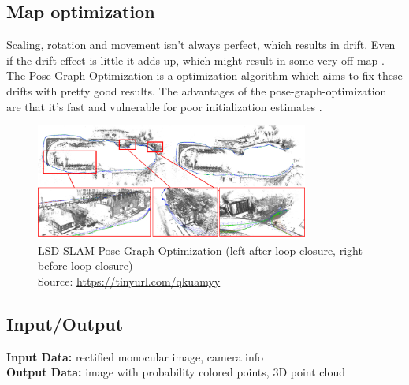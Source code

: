 \subsection{Map optimization}
Scaling, rotation and movement isn't always perfect, which results in drift. Even if the drift effect is little it adds up, which might result in some very off map \cite{lsdslam_eccv}. The Pose-Graph-Optimization is a optimization algorithm which aims to fix these drifts with pretty good results. The advantages of the pose-graph-optimization are that it's fast and vulnerable for poor initialization estimates \cite{posegraphoptimization}. \newline

\begin{figure}[h]
	\centering
	\includegraphics[width=0.8\textwidth]{./media/images/lsd-slam-pose-graph-optimization.jpg}
  	\caption{LSD-SLAM Pose-Graph-Optimization (left after loop-closure, right before loop-closure)
  	\\Source: \url{https://tinyurl.com/qkuamyy}}
  	\label{lsd-pose-graph-optimization}
\end{figure}

\subsection{Input/Output}
\textbf{Input Data:} rectified monocular image, camera info\\
\textbf{Output Data:} image with probability colored points, 3D point cloud